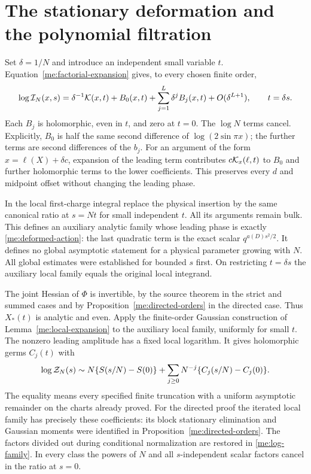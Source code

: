 \section{The stationary deformation and the polynomial filtration}
\label{me:filtration}
Set $\delta=1/N$ and introduce an independent small variable $t$.
Equation~\eqref{me:factorial-expansion} gives, to every chosen finite
order,
\begin{equation}\label{me:insertion-log}
 \log\mathcal I_N(x,s)=\delta^{-1}\mathcal K(x,t)+B_0(x,t)
               +\sum_{j=1}^L\delta^j B_j(x,t)+O(\delta^{L+1}),
 \qquad t=\delta s.
\end{equation}
Each $B_j$ is holomorphic, even in $t$, and zero at $t=0$.
The $\log N$ terms cancel. Explicitly, $B_0$ is half the same
second difference of $\log(2\sin\pi x)$; the further terms are
second differences of the $b_j$. For an argument of the form
$x=\ell(X)+\delta c$, expansion of the leading term contributes
$c\mathcal K_x(\ell,t)$ to $B_0$ and further holomorphic terms to the
lower coefficients. This preserves every $d$ and midpoint offset
without changing the leading phase.

In the local first-charge integral replace the physical insertion
by the same canonical ratio at $s=Nt$ for small independent $t$.
All its arguments remain bulk. This defines an auxiliary analytic
family whose leading phase is exactly
\eqref{me:deformed-action}: the last quadratic term is the exact
scalar $q^{a(D)s^2/2}$. It defines no global asymptotic statement
for a physical parameter growing with $N$. All global estimates
were established for bounded $s$ first. On restricting $t=\delta s$
the auxiliary local family equals the original local integrand.

The joint Hessian of $\Phi$ is invertible, by the source theorem
in the strict and summed cases and by
Proposition~\ref{me:directed-orders} in the directed case. Thus
$X_*(t)$ is analytic and even. Apply the finite-order Gaussian
construction of Lemma~\ref{me:local-expansion} to the auxiliary
local family, uniformly for small $t$. The nonzero leading
amplitude has a fixed local logarithm. It gives holomorphic germs
$C_j(t)$ with
\begin{equation}\label{me:log-family}
 \log\mathcal Z_N(s)\sim N\{S(s/N)-S(0)\}
       +\sum_{j\ge0}N^{-j}\{C_j(s/N)-C_j(0)\}.
\end{equation}
The equality means every specified finite truncation with a
uniform asymptotic remainder on the charts already proved.
For the directed proof the iterated local family has precisely
these coefficients: its block stationary elimination and Gaussian
moments were identified in Proposition~\ref{me:directed-orders}.
The factors divided out during conditional normalization are restored in
\eqref{me:log-family}. In every class the powers of $N$ and all
$s$-independent scalar factors cancel in the ratio at $s=0$.

